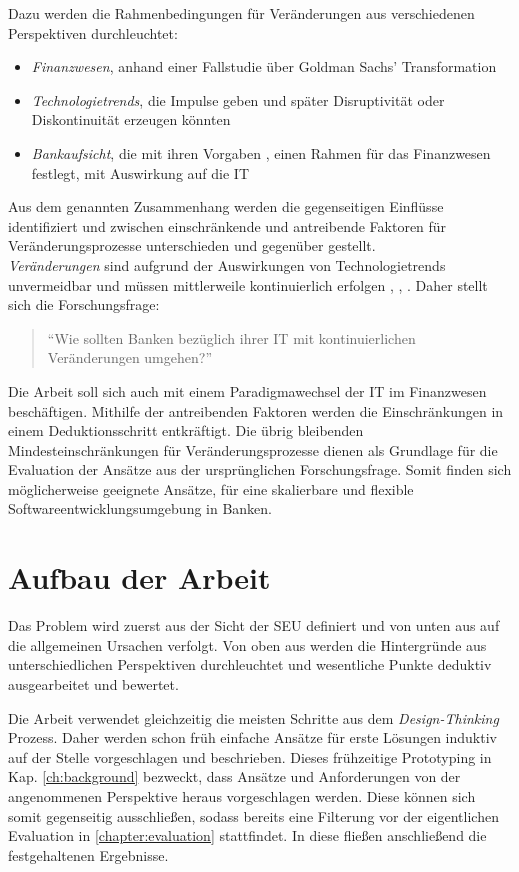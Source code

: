 Dazu werden die Rahmenbedingungen für Veränderungen aus verschiedenen Perspektiven durchleuchtet:
\begin{itemize}
    \item \emph{Finanzwesen}, anhand einer Fallstudie \cite{Gupta:2017} über Goldman Sachs' Transformation
    \item \emph{Technologietrends}, die Impulse geben und später Disruptivität oder Diskontinuität erzeugen könnten
    \item \emph{Bankaufsicht}, die mit ihren Vorgaben \cite{MaRisk:2017}, \cite{BAIT:2018} einen Rahmen für das Finanzwesen festlegt, mit Auswirkung auf die IT
\end{itemize}
 
Aus dem genannten Zusammenhang werden die gegenseitigen Einflüsse identifiziert und zwischen einschränkende und antreibende Faktoren für Veränderungsprozesse unterschieden und gegenüber gestellt. 
\medskip
\\
\emph{Veränderungen} sind aufgrund der Auswirkungen von Technologietrends unvermeidbar und müssen mittlerweile kontinuierlich erfolgen \cite{Bussmann2006}, \cite{Alt2017}, \cite{Fernandez:2020}. Daher stellt sich die Forschungsfrage: 
\begin{quote}
    \enquote{Wie sollten Banken bezüglich ihrer IT mit kontinuierlichen Veränderungen umgehen?}
\end{quote}

Die Arbeit soll sich auch mit einem Paradigmawechsel der IT im Finanzwesen beschäftigen. Mithilfe der antreibenden Faktoren werden die Einschränkungen in einem Deduktionsschritt entkräftigt. Die übrig bleibenden Mindesteinschränkungen für Veränderungsprozesse dienen als Grundlage für die Evaluation der Ansätze aus der ursprünglichen Forschungsfrage. Somit finden sich möglicherweise geeignete Ansätze, für eine skalierbare und flexible Softwareentwicklungsumgebung in Banken.


%
%
\section{Aufbau der Arbeit}
\label{sec:intro:structure}
Das Problem wird zuerst aus der Sicht der \ac{SEU} definiert und von unten aus auf die allgemeinen Ursachen verfolgt. Von oben aus werden die Hintergründe aus unterschiedlichen Perspektiven durchleuchtet und wesentliche Punkte deduktiv ausgearbeitet und bewertet.

Die Arbeit verwendet gleichzeitig die meisten Schritte aus dem \emph{Design-Thinking} Prozess. Daher werden schon früh einfache Ansätze für erste Lösungen induktiv auf der Stelle vorgeschlagen und beschrieben. Dieses frühzeitige Prototyping in Kap. \ref{ch:background} bezweckt, dass Ansätze und Anforderungen von der angenommenen Perspektive heraus vorgeschlagen werden. Diese können sich somit gegenseitig ausschließen, sodass bereits eine Filterung vor der eigentlichen Evaluation in \ref{chapter:evaluation} stattfindet. In diese fließen anschließend die festgehaltenen Ergebnisse.

